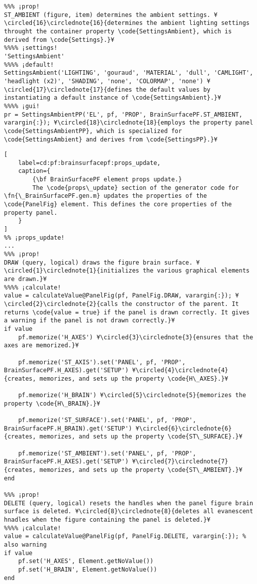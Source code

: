 \documentclass{tufte-handout}
\begin{document}
\begin{lstlisting}
%%% ¡prop!
ST_AMBIENT (figure, item) determines the ambient settings. ¥\circled{16}\circlednote{16}{determines the ambient lighting settings throught the container property \code{SettingsAmbient}, which is derived from \code{Settings}.}¥
%%%% ¡settings!
'SettingsAmbient'
%%%% ¡default!
SettingsAmbient('LIGHTING', 'gouraud', 'MATERIAL', 'dull', 'CAMLIGHT', 'headlight (x2)', 'SHADING', 'none', 'COLORMAP', 'none') ¥\circled{17}\circlednote{17}{defines the default values by instantiating a default instance of \code{SettingsAmbient}.}¥
%%%% ¡gui!
pr = SettingsAmbientPP('EL', pf, 'PROP', BrainSurfacePF.ST_AMBIENT, varargin{:}); ¥\circled{18}\circlednote{18}{employs the property panel \code{SettingsAmbientPP}, which is specialized for \code{SettingsAmbient} and derives from \code{SettingsPP}.}¥
\end{lstlisting}

\begin{lstlisting}[
	label=cd:pf:brainsurfacepf:props_update,
	caption={
		{\bf BrainSurfacePF element props update.}
		The \code{props\_update} section of the generator code for \fn{\_BrainSurfacePF.gen.m} updates the properties of the \code{PanelFig} element. This defines the core properties of the property panel.
	}
]
%% ¡props_update!
...
%%% ¡prop!
DRAW (query, logical) draws the figure brain surface. ¥\circled{1}\circlednote{1}{initializes the various graphical elements are drawn.}¥
%%%% ¡calculate!
value = calculateValue@PanelFig(pf, PanelFig.DRAW, varargin{:}); ¥\circled{2}\circlednote{2}{calls the constructor of the parent. It returns \code{value = true} if the panel is drawn correctly. It gives a warning if the panel is not drawn correctly.}¥
if value
    pf.memorize('H_AXES') ¥\circled{3}\circlednote{3}{ensures that the axes are memorized.}¥

    pf.memorize('ST_AXIS').set('PANEL', pf, 'PROP', BrainSurfacePF.H_AXES).get('SETUP') ¥\circled{4}\circlednote{4}{creates, memorizes, and sets up the property \code{H\_AXES}.}¥
    
    pf.memorize('H_BRAIN') ¥\circled{5}\circlednote{5}{memorizes the property \code{H\_BRAIN}.}¥

    pf.memorize('ST_SURFACE').set('PANEL', pf, 'PROP', BrainSurfacePF.H_BRAIN).get('SETUP') ¥\circled{6}\circlednote{6}{creates, memorizes, and sets up the property \code{ST\_SURFACE}.}¥
    
    pf.memorize('ST_AMBIENT').set('PANEL', pf, 'PROP', BrainSurfacePF.H_AXES).get('SETUP') ¥\circled{7}\circlednote{7}{creates, memorizes, and sets up the property \code{ST\_AMBIENT}.}¥
end

%%% ¡prop!
DELETE (query, logical) resets the handles when the panel figure brain surface is deleted. ¥\circled{8}\circlednote{8}{deletes all evanescent hnadles when the figure containing the panel is deleted.}¥
%%%% ¡calculate!
value = calculateValue@PanelFig(pf, PanelFig.DELETE, varargin{:}); % also warning
if value
    pf.set('H_AXES', Element.getNoValue())
    pf.set('H_BRAIN', Element.getNoValue())
end
\end{lstlisting}
\end{document}
